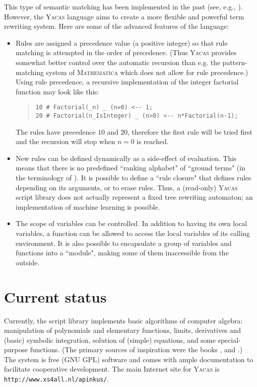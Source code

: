 \documentclass{llncs}
\begin{document}
This type of semantic matching has been implemented in the past
(see, e.g., \cite{C86}). However, the \textsc{Yacas} language
aims to create a more flexible and powerful term
rewriting system. Here are some of the advanced features of the language:


\begin{itemize}
%
\item
Rules are assigned a precedence value (a positive integer) so that
rule matching is attempted in the order of precedence. (Thus \textsc{Yacas} provides somewhat better control
over the automatic recursion than e.g. the pattern-matching system of \textsc{Mathematica}
which does not allow for rule precedence.)
Using rule precedence, a
recursive implementation of the integer factorial function may look like this:
%
\begin{quote}\small\begin{verbatim}
10 # Factorial(_n) _ (n=0) <-- 1;
20 # Factorial(n_IsInteger) _ (n>0) <-- n*Factorial(n-1);
\end{verbatim}\end{quote}
%
The rules have precedence $10$ and $20$, therefore the first rule will be tried first and the recursion will stop when $n = 0$ is reached.
%
\item
New rules can be defined dynamically as a side-effect of evaluation.
This means that there is no predefined ``ranking alphabet" of ``ground terms"
(in the terminology of \cite{TATA99}). It is possible to define a ``rule closure"
that defines rules depending on its arguments, or to erase rules. Thus, a
(read-only) \textsc{Yacas} script library does not actually represent a
fixed tree rewriting automaton; an implementation of machine learning is
possible.
%
\item
The scope of variables can be controlled. In addition to having its own
local variables, a function can be allowed to access the local variables of its
calling environment.
It is also possible to encapsulate a group of variables and functions into a
``module", making some of them inaccessible from the outside.
\end{itemize}

\section{Current status}

Currently, the script library implements basic algorithms of computer algebra:
manipulation of polynomials and elementary functions, limits, derivatives and
(basic) symbolic integration, solution of (simple) equations, and some special-purpose
functions. (The primary sources of inspiration were the books \cite{K98}, \cite{GG99} and
\cite{B86}.) The system is free (GNU GPL) software and comes with ample documentation to facilitate cooperative development. The main Internet site for \textsc{Yacas} is \texttt{http://www.xs4all.nl/\homedir apinkus/}.
\end{document}
